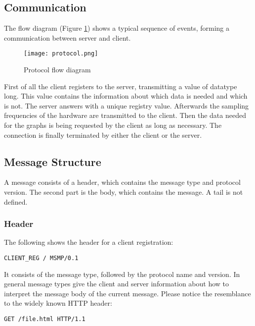 \subsection{Communication}

The flow diagram (Figure \ref{fig:protocol}) shows a typical sequence of events, forming a communication between server and client.
\begin{center}
	\begin{figure}
		\begin{center}
			\texttt{[image: protocol.png]} 
			\caption{Protocol flow diagram}
			\label{fig:protocol}
		\end{center}
	\end{figure}
\end{center}
First of all the client registers to the server, transmitting a value of datatype long. This value contains the information about which data is needed and which is not. The server answers with a unique registry value.\newline
Afterwards the sampling frequencies of the hardware are transmitted to the client.\newline
Then the data needed for the graphs is being requested by the client as long as necessary.\newline
The connection is finally terminated by either the client or the server.\newline


\subsection{Message Structure}
A message consists of a header, which contains the message type and protocol version. The second part is the body, which contains the message. A tail is not defined.

\subsubsection{Header}

The following shows the header for a client registration:
\begin{lstlisting}[caption={A MSMonitor Protocol Header}, label=lst:HeaderMSMP]
CLIENT_REG / MSMP/0.1
\end{lstlisting}
It consists of the message type, followed by the protocol name and version. In general message types give the client and server information about how to interpret the message body of the current message.\newline
Please notice the resemblance to the widely known HTTP header:
\begin{lstlisting}[caption={A HTTP Header}, label=lst:HeaderHTTP]
GET /file.html HTTP/1.1
\end{lstlisting} 


